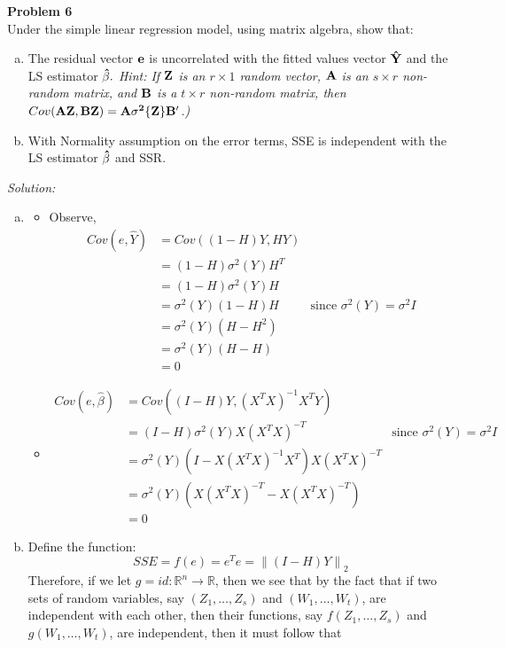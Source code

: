\documentclass{article}
\newenvironment{problem}[2][Problem]
    { \begin{mdframed}[backgroundcolor=gray!20] \textbf{#1 #2} \\}
    {  \end{mdframed}}
\newenvironment{solution}
    {\textit{Solution:}}
    {}
\newcommand{\norm}[1]{\left\lVert#1\right\rVert}
\begin{document}
\begin{problem}{6}
Under the simple linear regression model, using matrix algebra, show that:
\begin{enumerate}[(a)]
\item The residual vector $\bf{e}$ is uncorrelated with the fitted values vector $\bf{\hat Y}$ and the LS estimator $\bf{\hat \beta}.$ \emph{Hint: If $\bf{Z}$ is an $r \times 1$ random vector, $\bf{A}$ is an $s \times r$ non-random matrix, and $\bf{B}$ is a $t \times r$ non-random matrix, then $Cov( \bf{AZ}, \bf{BZ}) = \bf{A\sigma^2\{Z\}B'}$.)}
\item With Normality assumption on the error terms, SSE is independent with the LS estimator $\bf{\hat \beta}$ and SSR.
\end{enumerate}
\end{problem}
\begin{solution}
\begin{enumerate}[(a)]
\item \begin{itemize}
\item Observe, 
\begin{align*}
Cov(e, \hat Y) &= Cov((1 - H) Y, H Y) \\
&= (1 - H) \sigma^2(Y) H^T\\ 
&= (1 - H) \sigma^2(Y) H \\
&= \sigma^2(Y) (1 - H)  H  & \text{since }  \sigma^2(Y) = \sigma^2 I \\
&=  \sigma^2(Y)(H - H^2) \\
&=   \sigma^2(Y)(H - H) \\
&= 0
\end{align*}
\item 
\begin{align*}
Cov(e, \hat \beta) &= Cov((I - H)Y, (X^TX)^{-1}X^T Y) \\
&= (I - H)\sigma^2(Y)X(X^TX)^{-T} & \text{since }  \sigma^2(Y) = \sigma^2 I \\
&=\sigma^2(Y) (I - X(X^TX)^{-1} X^T)X(X^TX)^{-T} \\
&=\sigma^2(Y) (X(X^TX)^{-T} - X(X^TX)^{-T}) \\
&= 0
\end{align*}
\end{itemize}
\item Define the function:
$$SSE = f(e) = e^Te = \norm{(I - H)Y}_2$$
Therefore, if we let $g = id : \mathbb R^n \rightarrow \mathbb R$, then we see that by the fact that if two sets of random variables, say $(Z_1, \ldots, Z_s)$ and $(W_1,\ldots ,W_t)$, are independent with each other, then their functions, say $f(Z_1, \ldots, Z_s)$ and $g(W_1, \ldots , W_t)$, are independent, then it must follow that 


\end{enumerate}
\end{solution}
\end{document}
